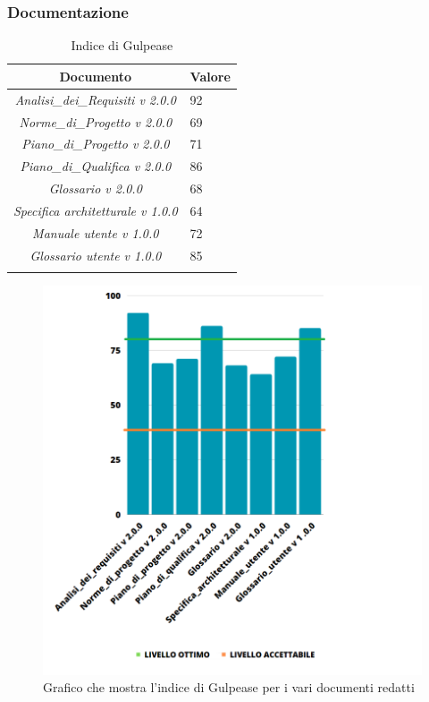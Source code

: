 \subsubsection{Documentazione}
\begin{table}[H]
	\centering
	\setlength\extrarowheight{5pt}
	\renewcommand\tabularxcolumn[1]{>{\Centering}m{#1}}
	\begin{tabularx}{\textwidth}{| c | X |} 
		\hline
		\rowcolor{white}
		\textbf{Documento} & \textbf{Valore}\\
		\hline
		\textit{Analisi\_dei\_Requisiti v 2.0.0} & 92 \\
		\hline
		\textit{Norme\_di\_Progetto v 2.0.0} & 69\\
		\hline
		\textit{Piano\_di\_Progetto v 2.0.0} & 71\\
		\hline
		\textit{Piano\_di\_Qualifica v 2.0.0} & 86\\
		\hline
		\textit{Glossario v 2.0.0} & 68\\
        \hline
		\textit{Specifica architetturale v 1.0.0} & 64\\
        \hline
		\textit{Manuale utente v 1.0.0} & 72\\
         \hline
		\textit{Glossario utente v 1.0.0} & 85\\
		\hline
		\rowcolor{white}
		\caption{Indice di Gulpease}
	\end{tabularx}
\end{table}
\begin{figure}[H]
	\centering
	\includegraphics[scale=1.1]{img/Gulpease2.png}
	\caption{Grafico che mostra l'indice di Gulpease per i vari documenti redatti}
\end{figure}
